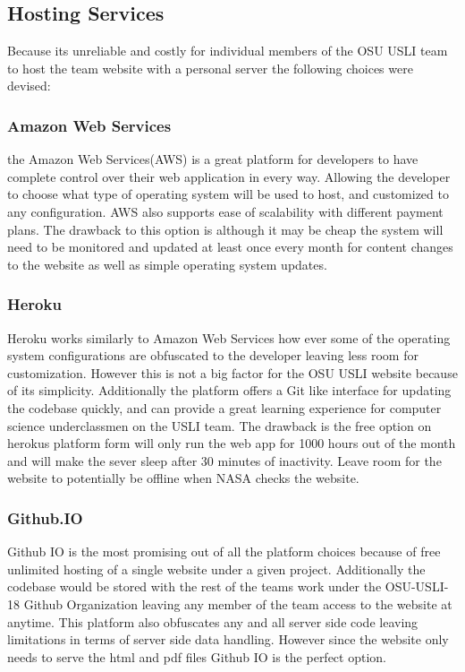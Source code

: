 \documentclass[onecolumn, draftclsnofoot,10pt, compsoc]{IEEEtran}
\begin{document}
\subsection{Hosting Services}
Because its unreliable and costly for individual members of the OSU USLI team to host the team website with a personal server the following choices were devised:
\subsubsection{Amazon Web Services}
the Amazon Web Services(AWS) is a great platform for developers to have complete control over their web application in every way. Allowing the developer to choose what type of operating system will be used to host, and customized to any configuration. AWS also supports ease of scalability with different payment plans. The drawback to this option is although it may be cheap the system will need to be monitored and updated at least once every month for content changes to the website as well as simple operating system updates.
\subsubsection{Heroku}
Heroku works similarly to Amazon Web Services how ever some of the operating system configurations are obfuscated to the developer leaving less room for customization. However this is not a big factor for the OSU USLI website because of its simplicity. Additionally the platform offers a Git like interface for updating the codebase quickly, and can provide a great learning experience for computer science underclassmen on the USLI team. The drawback is the free option on herokus platform form will only run the web app for 1000 hours out of the month and will make the sever sleep after 30 minutes of inactivity\cite{heroku:online}. Leave room for the website to potentially be offline when NASA checks the website.
\subsubsection{Github.IO}
Github IO is the most promising out of all the platform choices because of free unlimited hosting of a single website under a given project. Additionally the codebase would be stored with the rest of the teams work under the OSU-USLI-18 Github Organization leaving any member of the team access to the website at anytime\cite{GitHubPa21:online}. This platform also obfuscates any and all server side code leaving limitations in terms of server side data handling. However since the website only needs to serve the html and pdf files Github IO is the perfect option. 
\end{document}
